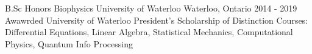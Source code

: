 


\begin{cventries}


\cventry
{B.Sc Honors Biophysics}%
{University of Waterloo}
{Waterloo, Ontario} %
    {2014 - 2019} %
{ %
    Awawrded University of Waterloo President's Scholarship of Distinction\vspace{0.05mm}
    \newline Courses: Differential Equations, Linear Algebra, Statistical Mechanics, Computational Physics, Quantum Info Processing 
}


\end{cventries}
